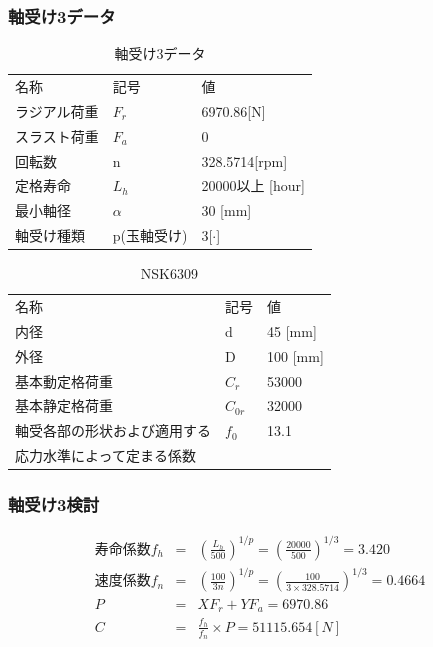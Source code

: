 \documentclass[a4j,twoside,openright,11pt]{jreport}
\begin{document}
\subsubsection{軸受け3データ}
\begin{table}[htb]
\begin{center}
  \caption{軸受け3データ}
  \begin{tabular}{lll} \hline
名称&記号&値\\
ラジアル荷重&$F_r$&6970.86[N]\\
スラスト荷重&$F_a$&0\\
回転数&n&328.5714[rpm]\\
定格寿命&$L_h$&20000以上 [hour]\\
最小軸径&$\alpha$&30 [mm]\\
軸受け種類&p(玉軸受け)&3[$\cdot$]\\
\hline
  \end{tabular}
\end{center}
\end{table}

\begin{table}[htb]
\begin{center}
  \caption{NSK6309}
  \begin{tabular}{lll} \hline
名称&記号&値\\
内径& d &45 [mm]\\
外径& D &100 [mm]\\
基本動定格荷重&$C_{r}$&53000\\
基本静定格荷重&$C_{0r}$&32000\\
軸受各部の形状および適用する&$f_0$&13.1\\
応力水準によって定まる係数&&\\
\hline
  \end{tabular}
\end{center}
\end{table}

\subsubsection{軸受け3検討}
\begin{eqnarray}
寿命係数f_h &=& \left( \frac{L_h}{500} \right)^{1/p} = \left( \frac{20000}{500} \right)^{1/3} = 3.420\\
速度係数f_n &=& \left( \frac{100}{3n} \right)^{1/p} = \left( \frac{100}{3 \times 328.5714} \right)^{1/3} = 0.4664\\
P &=& XF_r+YF_a = 6970.86\\
C &=& \frac{f_h}{f_n} \times P = 51115.654[N]
\end{eqnarray}
\end{document}
